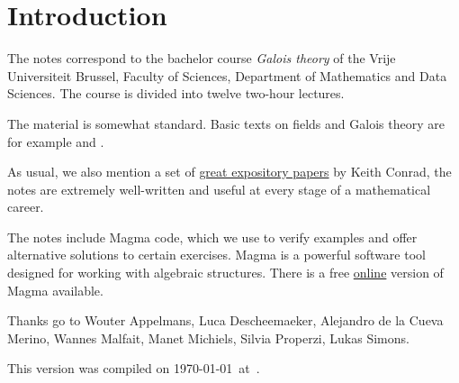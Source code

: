\section*{Introduction}

The notes correspond to the bachelor 
course \emph{Galois theory} of the 
Vrije Universiteit Brussel, 
Faculty of Sciences, 
Department of Mathematics and Data Sciences. The course
is divided into twelve two-hour lectures. 

The material is somewhat standard. Basic texts on fields and Galois theory 
are for example \cite{MR1645586} and 
\cite{MR3379917}. 

As usual, we also mention a set of 
\href{https://kconrad.math.uconn.edu/blurbs/}{great expository papers} by 
Keith Conrad, the notes are extremely well-written and useful  
at every stage of a mathematical career. 


The notes include Magma code, which we use to verify examples and offer alternative solutions to certain exercises. Magma is a powerful software tool designed for working with algebraic structures. There is a free \href{https://magma.maths.usyd.edu.au/calc/}{online} version of Magma available.

 
Thanks go to Wouter Appelmans, Luca Descheemaeker, 
Alejandro de la Cueva Merino, 
Wannes Malfait, Manet Michiels, Silvia Properzi, 
Lukas Simons. 


This version 
was compiled on \today~at~\currenttime.
